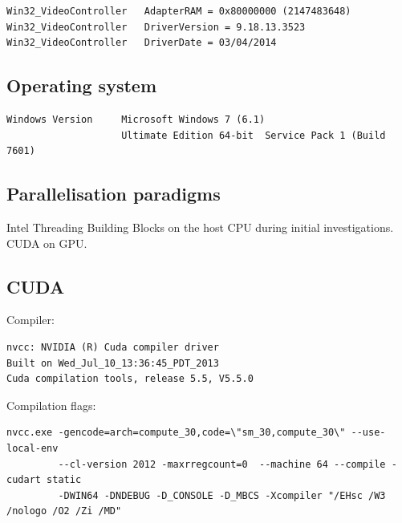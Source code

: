 \documentclass[11pt, oneside, a4paper]{article}
\begin{document}
\begin{appendices}
\begin{verbatim}
Win32_VideoController   AdapterRAM = 0x80000000 (2147483648)
Win32_VideoController   DriverVersion = 9.18.13.3523
Win32_VideoController   DriverDate = 03/04/2014
\end{verbatim}

\subsection{Operating system} %
\label{sub:operating_system}
\begin{verbatim}
Windows Version     Microsoft Windows 7 (6.1)
                    Ultimate Edition 64-bit  Service Pack 1 (Build 7601) 
\end{verbatim}

\subsection{Parallelisation paradigms} %
\label{sub:parallelisation_paradigms}
Intel Threading Building Blocks on the host CPU during initial investigations. CUDA on GPU.

\subsection{CUDA} %
\label{sub:cuda}
Compiler:
\begin{verbatim}
nvcc: NVIDIA (R) Cuda compiler driver
Built on Wed_Jul_10_13:36:45_PDT_2013
Cuda compilation tools, release 5.5, V5.5.0
\end{verbatim}
Compilation flags:
\begin{verbatim}
nvcc.exe -gencode=arch=compute_30,code=\"sm_30,compute_30\" --use-local-env 
         --cl-version 2012 -maxrregcount=0  --machine 64 --compile -cudart static 
         -DWIN64 -DNDEBUG -D_CONSOLE -D_MBCS -Xcompiler "/EHsc /W3 /nologo /O2 /Zi /MD"
\end{verbatim}



\end{appendices}
\end{document}
